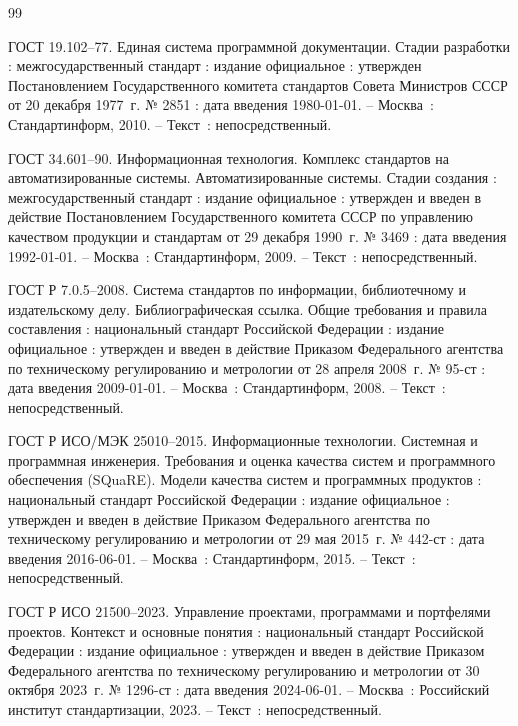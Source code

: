 
\begin{thebibliography}{99}

	 ГОСТ 19.102--77. Единая система программной документации. Стадии разработки : межгосударственный стандарт : издание официальное : утвержден Постановлением Государственного комитета стандартов Совета Министров СССР от 20 декабря 1977~г. № 2851 : дата введения 1980-01-01. -- Москва~: Стандартинформ, 2010. -- Текст~: непосредственный.

	 ГОСТ 34.601--90. Информационная технология. Комплекс стандартов на автоматизированные системы. Автоматизированные системы. Стадии создания : межгосударственный стандарт : издание официальное : утвержден и введен в действие Постановлением Государственного комитета СССР по управлению качеством продукции и стандартам от 29 декабря 1990~г. № 3469 : дата введения 1992-01-01. -- Москва~: Стандартинформ, 2009. -- Текст~: непосредственный.

	 ГОСТ Р 7.0.5--2008. Система стандартов по информации, библиотечному и издательскому делу. Библиографическая ссылка. Общие требования и правила составления : национальный стандарт Российской Федерации : издание официальное : утвержден и введен в действие Приказом Федерального агентства по техническому регулированию и метрологии от 28 апреля 2008~г. № 95-ст : дата введения 2009-01-01. -- Москва~: Стандартинформ, 2008. -- Текст~: непосредственный.

	 ГОСТ Р ИСО/МЭК 25010--2015. Информационные технологии. Системная и программная инженерия. Требования и оценка качества систем и программного обеспечения (SQuaRE). Модели качества систем и программных продуктов : национальный стандарт Российской Федерации : издание официальное : утвержден и введен в действие Приказом Федерального агентства по техническому регулированию и метрологии от 29 мая 2015~г. № 442-ст : дата введения 2016-06-01. -- Москва~: Стандартинформ, 2015. -- Текст~: непосредственный.

	 ГОСТ Р ИСО 21500--2023. Управление проектами, программами и портфелями проектов. Контекст и основные понятия : национальный стандарт Российской Федерации : издание официальное : утвержден и введен в действие Приказом Федерального агентства по техническому регулированию и метрологии от 30 октября 2023~г. № 1296-ст : дата введения 2024-06-01. -- Москва~: Российский институт стандартизации, 2023. -- Текст~: непосредственный.


\end{thebibliography}
